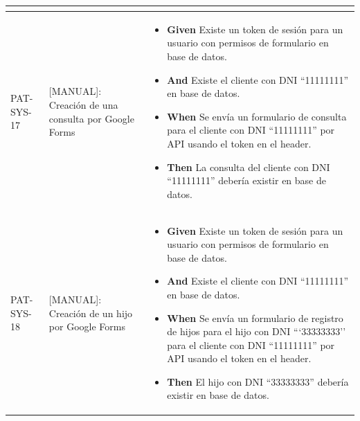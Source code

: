 \begin{longtable}{|p{1cm}|p{2.5cm}|p{12cm}|}
\begin{itemize}
    \end{itemize}
    \\
    \hline
    PAT-SYS-17 & [MANUAL]: Creación de una consulta por Google Forms & 
    \begin{itemize}
        \item \textbf{Given} Existe un token de sesión para un usuario con permisos de formulario en base de datos.
        \item \textbf{And} Existe el cliente con DNI ``11111111'' en base de datos.
        \newline
        \item \textbf{When} Se envía un formulario de consulta para el cliente con DNI ``11111111'' por API usando el token en el header.
        \newline
        \item \textbf{Then} La consulta del cliente con DNI ``11111111'' debería existir en base de datos.
    \end{itemize}
    \\
    \hline
    PAT-SYS-18 & [MANUAL]: Creación de un hijo por Google Forms & 
    \begin{itemize}
        \item \textbf{Given} Existe un token de sesión para un usuario con permisos de formulario en base de datos.
        \item \textbf{And} Existe el cliente con DNI ``11111111'' en base de datos.
        \newline
        \item \textbf{When} Se envía un formulario de registro de hijos para el hijo con DNI ```33333333'' para el cliente con DNI ``11111111'' por API usando el token en el header.
        \newline
        \item \textbf{Then} El hijo con DNI ``33333333'' debería existir en base de datos.
    \end{itemize}
    \\
    \hline
\end{longtable}
